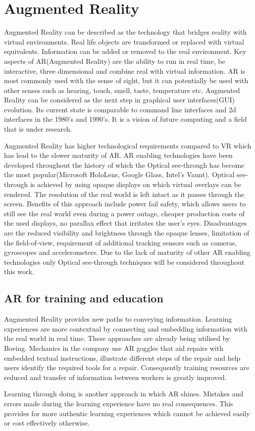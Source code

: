 \documentclass[12pt, a4paper,oneside, nocenter]{thesis}
\begin{document}
\section{Augmented Reality}%
Augmented Reality can be described as the technology that bridges reality with virtual environments. Real life objects are transformed or replaced with virtual equivalents. Information can be added or removed to the real environment. Key aspects of AR(Augmented Reality) are the ability to run in real time, be interactive, three dimensional and combine real with virtual information. AR is most commonly used with the sense of sight, but it can potentially be used with other senses such as hearing, touch, smell, taste, temperature etc. Augmented Reality can be considered as the next step in graphical user interfaces(GUI) evolution\citep{prototyping-ar}. Its current state is comparable to command line interfaces and 2d interfaces in the 1980's and 1990's. It is a vision of future computing and a field that is under research.\par
Augmented Reality has higher technological requirements compared to VR which has lead to the slower maturity of AR. AR enabling technologies have been developed throughout the history of which the Optical see-through has become the most popular(Microsoft HoloLens, Google Glass, Intel's Vaunt). Optical see-through is achieved by using opaque displays on which virtual overlays can be rendered. The resolution of the real world is left intact as it passes through the screen. Benefits of this approach include power fail safety, which allows users to still see the real world even during a power outage, cheaper production costs of the used displays, no parallax effect that irritates the user's eyes. Disadvantages are the reduced visibility and brightness through the opaque lenses, limitation of the field-of-view, requirement of additional tracking sensors such as cameras, gyroscopes and accelerometers. Due to the lack of maturity of other AR enabling technologies only Optical see-through techniques will be considered throughout this work\citep{vrjournal}.
\subsection{AR for training and education}%
Augmented Reality provides new paths to conveying information. Learning experiences are more contextual by connecting and embedding information with the real world in real time. These approaches are already being utilised by Boeing. 
Mechanics in the company use AR goggles that aid repairs with embedded textual instructions, 
illustrate different steps of the repair and help users identify the required tools for a repair. 
Consequently training resources are reduced and transfer of information between workers is greatly 
improved\citep{horizon-report}.\par
Learning through doing is another approach in which AR shines. Mistakes and errors made during the learning
experience have no real consequences. This provides for more authentic learning experiences which cannot be
achieved easily or cost effectively otherwise\citep{augmented-reality}.
\end{document}
